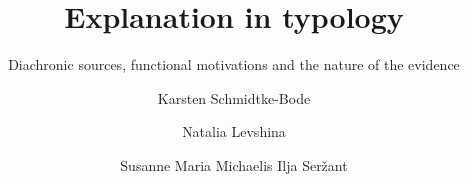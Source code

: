 \title{Explanation in typology}
\subtitle{Diachronic sources, functional motivations and the nature of the evidence}  
\BackBody{~}
\author{ 
Karsten Schmidtke-Bode 			
\and
Natalia Levshina 			
\and
Susanne Maria Michaelis 			
\lastand
Ilja Seržant }
\renewcommand{\lsSeries}{cfls} %
\renewcommand{\lsSeriesNumber}{} %

